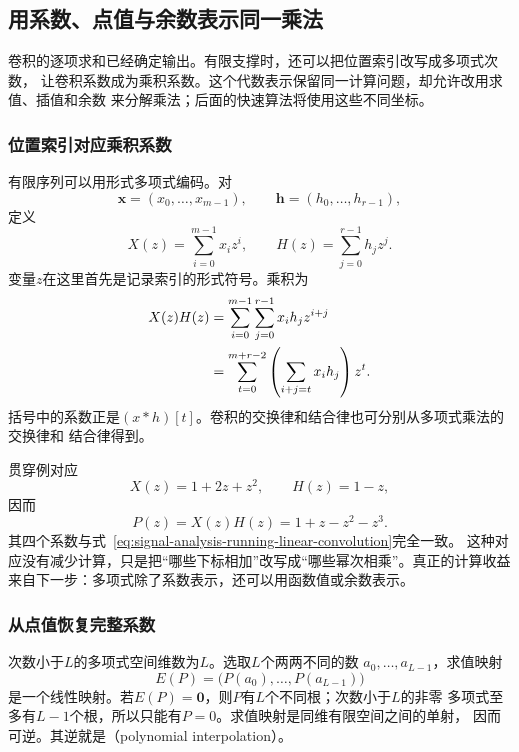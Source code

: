 \subsection{用系数、点值与余数表示同一乘法}
\label{sec:signal-analysis-polynomial-arithmetic}

卷积的逐项求和已经确定输出。有限支撑时，还可以把位置索引改写成多项式次数，
让卷积系数成为乘积系数。这个代数表示保留同一计算问题，却允许改用求值、插值和余数
来分解乘法；后面的快速算法将使用这些不同坐标。

\subsubsection{位置索引对应乘积系数}

有限序列可以用形式多项式编码。对
\[
  \bm{x}=(x_0,\ldots,x_{m-1}),\qquad
  \bm{h}=(h_0,\ldots,h_{r-1}),
\]
定义
\[
  X(z)=\sum_{i=0}^{m-1}x_i z^i,\qquad
  H(z)=\sum_{j=0}^{r-1}h_j z^j.
\]
变量$z$在这里首先是记录索引的形式符号。乘积为
\begin{align}
  X(z)H(z)
  &=
  \sum_{i=0}^{m-1}\sum_{j=0}^{r-1}x_i h_jz^{i+j}
  \notag\\
  &=
  \sum_{t=0}^{m+r-2}
  \left(\sum_{i+j=t}x_i h_j\right)z^t.
  \label{eq:signal-analysis-polynomial-convolution}
\end{align}
括号中的系数正是$(x*h)[t]$。卷积的交换律和结合律也可分别从多项式乘法的交换律和
结合律得到。

贯穿例对应
\[
  X(z)=1+2z+z^2,\qquad H(z)=1-z,
\]
因而
\begin{equation}
  P(z)=X(z)H(z)=1+z-z^2-z^3.
  \label{eq:signal-analysis-running-polynomial-product}
\end{equation}
其四个系数与式~\eqref{eq:signal-analysis-running-linear-convolution}完全一致。
这种对应没有减少计算，只是把“哪些下标相加”改写成“哪些幂次相乘”。真正的计算收益
来自下一步：多项式除了系数表示，还可以用函数值或余数表示。

\subsubsection{从点值恢复完整系数}

次数小于$L$的多项式空间维数为$L$。选取$L$个两两不同的数
$a_0,\ldots,a_{L-1}$，求值映射
\[
  E(P)=\bigl(P(a_0),\ldots,P(a_{L-1})\bigr)
\]
是一个线性映射。若$E(P)=\bm{0}$，则$P$有$L$个不同根；次数小于$L$的非零
多项式至多有$L-1$个根，所以只能有$P=0$。求值映射是同维有限空间之间的单射，
因而可逆。其逆就是（polynomial interpolation）。

